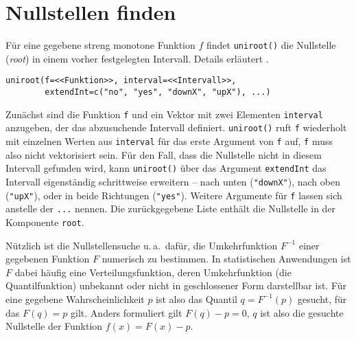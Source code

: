 \section{Nullstellen finden}
\label{sec:uniroot}

Für eine gegebene streng monotone Funktion $f$ findet \lstinline!uniroot()! die Nullstelle (\emph{root}) in einem vorher festgelegten Intervall. Details erläutert .
\begin{lstlisting}
uniroot(f=<<Funktion>>, interval=<<Intervall>>,
        extendInt=c("no", "yes", "downX", "upX"), ...)
\end{lstlisting}

Zunächst sind die Funktion \lstinline!f! und ein Vektor mit zwei Elementen \lstinline!interval! anzugeben, der das abzusuchende Intervall definiert. \lstinline!uniroot()! ruft \lstinline!f! wiederholt mit einzelnen Werten aus \lstinline!interval! für das erste Argument von \lstinline!f! auf, \lstinline!f! muss also nicht vektorisiert sein. Für den Fall, dass die Nullstelle nicht in diesem Intervall gefunden wird, kann \lstinline!uniroot()! über das Argument \lstinline!extendInt! das Intervall eigenständig schrittweise erweitern -- nach unten (\lstinline!"downX"!), nach oben (\lstinline!"upX"!), oder in beide Richtungen (\lstinline!"yes"!). Weitere Argumente für \lstinline!f! lassen sich anstelle der \lstinline!...! nennen. Die zurückgegebene Liste enthält die Nullstelle in der Komponente \lstinline!root!.

Nützlich ist die Nullstellensuche u.\,a.\ dafür, die Umkehrfunktion $F^{-1}$ einer gegebenen Funktion $F$ numerisch zu bestimmen. In statistischen Anwendungen ist $F$ dabei häufig eine Verteilungsfunktion, deren Umkehrfunktion (die Quantilfunktion) unbekannt oder nicht in geschlossener Form darstellbar ist. Für eine gegebene Wahrscheinlichkeit $p$ ist also das Quantil $q = F^{-1}(p)$ gesucht, für das $F(q) = p$ gilt. Anders formuliert gilt $F(q) - p = 0$, $q$ ist also die gesuchte Nullstelle der Funktion $f(x) = F(x) - p$.

